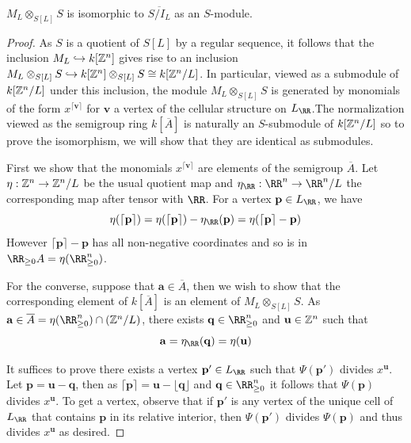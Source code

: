 \documentclass{amsart}
\begin{document}
\begin{prop}
  \label{prop:resolves-integral-closure}
  $M_L \otimes_{S[L]} S$ is isomorphic to $\overline{S/I_L}$ as an $S$-module.
\end{prop}
\begin{proof}
  As $S$ is a quotient of $S[L]$ by a regular sequence, it follows that the inclusion $M_L\hookrightarrow k[\mathbb Z^n]$ gives rise to an inclusion $M_L\otimes_{S[L]} S \hookrightarrow k[\mathbb Z^n]\otimes_{S[L]} S \cong k[\mathbb Z^n/L]$. In particular, viewed as a submodule of $k[\mathbb Z^n/L]$ under this inclusion, the module $M_L\otimes_{S[L]} S$ is generated by monomials of the form $x^{\lceil \mathbf{v}\rceil}$ for $\mathbf{v}$ a vertex of the cellular structure on $L_{\RR}$.The normalization viewed as the semigroup ring $k[\overline{A}]$ is naturally an $S$-submodule of $k[\mathbb Z^n/L]$ so to prove the isomorphism, we will show that they are identical as submodules.

  First we show that the monomials $x^{\lceil \mathbf{v}\rceil}$ are elements of the semigroup $\overline{A}$.
  Let $\eta:\mathbb Z^n\rightarrow \mathbb Z^n/L$ be the usual quotient map and $\eta_{\RR}:\RR^n\rightarrow \RR^n/L$ the corresponding map after tensor with $\RR$. For a vertex $\mathbf{p}\in L_{\RR}$, we have
  \[\eta(\lceil \mathbf{p}\rceil) = \eta(\lceil \mathbf{p}\rceil)-\eta_{\RR}(\mathbf{p}) = \eta(\lceil \mathbf{p}\rceil - \mathbf{p})\]
  However $\lceil \mathbf{p}\rceil - \mathbf{p}$ has all non-negative coordinates and so is in $\RR_{\geq 0} A=\eta(\RR_{\geq 0}^n)$.

  For the converse, suppose that $\mathbf{a}\in \overline{A}$, then
  we wish to show that the corresponding element of $k[\overline{A}]$ is an element of $M_L\otimes_{S[L]} S$.
  As $\mathbf{a}\in \overline{A} = \eta(\RR_{\geq 0}^n)\cap (\ZZ^n/L)$, there exists
  $\mathbf{q}\in \RR_{\geq 0}^n$ and $\mathbf{u}\in \mathbb Z^n$ such that
  \[\mathbf{a} = \eta_{\RR}(\mathbf{q}) = \eta(\mathbf{u})\]

  It suffices to prove there exists a vertex $\mathbf{p}'\in L_{\RR}$ such that $\Psi(\mathbf{p}')$ divides $x^{\mathbf{u}}$.
  Let $\mathbf{p}=\mathbf{u}-\mathbf{q}$, then as $\lceil \mathbf{p} \rceil = \mathbf{u} - \lfloor \mathbf{q}\rfloor$ and $\mathbf{q}\in \RR_{\geq 0}^n$ it follows that $\Psi(\mathbf{p})$ divides $x^{\mathbf{u}}$. To get a vertex, observe that if $\mathbf{p}'$ is any vertex of the unique cell of $L_{\RR}$ that contains $\mathbf{p}$ in its relative interior, then $\Psi(\mathbf{p}')$ divides $\Psi(\mathbf{p})$ and thus divides $x^{\mathbf{u}}$ as desired.
\end{proof}
\end{document}
